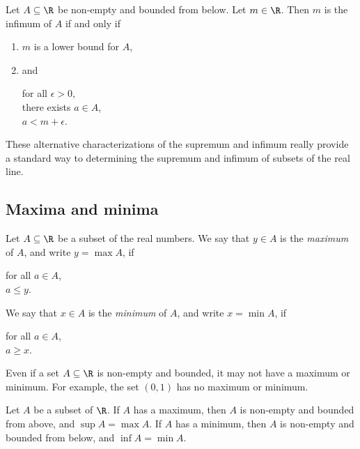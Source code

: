 \begin{proposition}
    Let $A \subseteq \R$ be non-empty and bounded from below. Let $m \in \R$. Then $m$ is the infimum of $A$ if and only if
    \begin{enumerate}
        \item $m$ is a lower bound for $A$,
        \item and 
            \begin{center}
                \parbox{\linewidth}{
                    \linewidth
                    for all $\epsilon > 0$, \\
                    \tab there exists $a \in A$, \\
                    \tab\tab $a < m + \epsilon$.
                }
            \end{center}
    \end{enumerate}
\end{proposition}

These alternative characterizations of the supremum and infimum really provide a standard way to determining the supremum and infimum of subsets of the real line.

\subsection{Maxima and minima}
\begin{definition}
    Let $A \subseteq \R$ be a subset of the real numbers. We say that $y \in A$ is the \emph{maximum} of $A$, and write $y = \max A$, if 
    \begin{center}
        for all $a \in A$, \\
        $a \le y$.
    \end{center}

    We say that $x \in A$ is the \emph{minimum} of $A$, and write $x = \min A$, if
    \begin{center}
        for all $a \in A$, \\
        $a \ge x$.
    \end{center}
\end{definition}

\begin{remark}
    Even if a set $A \subseteq \R$ is non-empty and bounded, it may not have a maximum or minimum. For example, the set $(0, 1)$ has no maximum or minimum.
\end{remark}

\begin{proposition}
    Let $A$ be a subset of $\R$. If $A$ has a maximum, then $A$ is non-empty and bounded from above, and $\sup A = \max A$. If $A$ has a minimum, then $A$ is non-empty and bounded from below, and $\inf A = \min A$.
\end{proposition}

